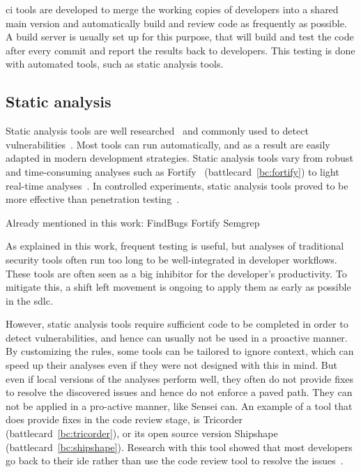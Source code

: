 \Gls{ci} tools are developed to merge the working copies of developers into a shared main version and automatically build and review code as frequently as possible.
A build server is usually set up for this purpose, that will build and test the code after every commit and report the results back to developers.
This testing is done with automated tools, such as static analysis tools.

\subsection{Static analysis}
Static analysis tools are well researched~\cite{li2017static,jovanovic2006pixy,livshits2005finding} and commonly used to detect vulnerabilities~\cite{cruzes2017security,bsimm9,bsimm11}.
Most tools can run automatically, and as a result are easily adapted in modern development strategies.
Static analysis tools vary from robust and time-consuming analyses such as Fortify~\cite{chess2004static} (battlecard~\ref{bc:fortify}) to light real-time analyses~\cite{brown2016build}.
In controlled experiments, static analysis tools proved to be more effective than penetration testing~\cite{Scandariato2013}.

Already mentioned in this work:
FindBugs
Fortify
Semgrep

As explained in this work, frequent testing is useful, but analyses of traditional security tools often run too long to be well-integrated in developer workflows.
These tools are often seen as a big inhibitor for the developer's productivity.
To mitigate this, a shift left movement is ongoing to apply them as early as possible in the \gls{sdlc}.

However, static analysis tools require sufficient code to be completed in order to detect vulnerabilities, and hence can usually not be used in a proactive manner.
By customizing the rules, some tools can be tailored to ignore context, which can speed up their analyses even if they were not designed with this in mind.
But even if local versions of the analyses perform well, they often do not provide fixes to resolve the discovered issues and hence do not enforce a paved path.
They can not be applied in a pro-active manner, like Sensei can.
An example of a tool that does provide fixes in the code review stage, is Tricorder~\cite{sadowski2015tricorder} (battlecard~\ref{bc:tricorder}), or its open source version Shipshape (battlecard~\ref{bc:shipshape}).
Research with this tool showed that most developers go back to their \gls{ide} rather than use the code review tool to resolve the issues~\cite{sadowski2015tricorder}.

